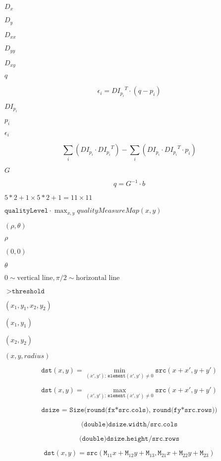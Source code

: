 \documentclass{article}
\begin{document}
$D_x$
\pagebreak

$D_y$
\pagebreak

$D_{xx}$
\pagebreak

$D_{yy}$
\pagebreak

$D_{xy}$
\pagebreak

$q$
\pagebreak

\[\epsilon _i = {DI_{p_i}}^T  \cdot (q - p_i)\]
\pagebreak

${DI_{p_i}}$
\pagebreak

$p_i$
\pagebreak

$\epsilon_i$
\pagebreak

\[\sum _i(DI_{p_i}  \cdot {DI_{p_i}}^T) -  \sum _i(DI_{p_i}  \cdot {DI_{p_i}}^T  \cdot p_i)\]
\pagebreak

$G$
\pagebreak

\[q = G^{-1}  \cdot b\]
\pagebreak

$5*2+1 \times 5*2+1 = 11 \times 11$
\pagebreak

$\texttt{qualityLevel} \cdot \max_{x,y} qualityMeasureMap(x,y)$
\pagebreak

$(\rho, \theta)$
\pagebreak

$\rho$
\pagebreak

$(0,0)$
\pagebreak

$\theta$
\pagebreak

$0 \sim \textrm{vertical line}, \pi/2 \sim \textrm{horizontal line}$
\pagebreak

$>\texttt{threshold}$
\pagebreak

$(x_1, y_1, x_2, y_2)$
\pagebreak

$(x_1,y_1)$
\pagebreak

$(x_2, y_2)$
\pagebreak

$(x, y, radius)$
\pagebreak

\[\texttt{dst} (x,y) =  \min _{(x',y'):  \, \texttt{element} (x',y') \ne0 } \texttt{src} (x+x',y+y')\]
\pagebreak

\[\texttt{dst} (x,y) =  \max _{(x',y'):  \, \texttt{element} (x',y') \ne0 } \texttt{src} (x+x',y+y')\]
\pagebreak

\[\texttt{dsize = Size(round(fx*src.cols), round(fy*src.rows))}\]
\pagebreak

\[\texttt{(double)dsize.width/src.cols}\]
\pagebreak

\[\texttt{(double)dsize.height/src.rows}\]
\pagebreak

\[\texttt{dst} (x,y) =  \texttt{src} ( \texttt{M} _{11} x +  \texttt{M} _{12} y +  \texttt{M} _{13}, \texttt{M} _{21} x +  \texttt{M} _{22} y +  \texttt{M} _{23})\]
\pagebreak
\end{document}
